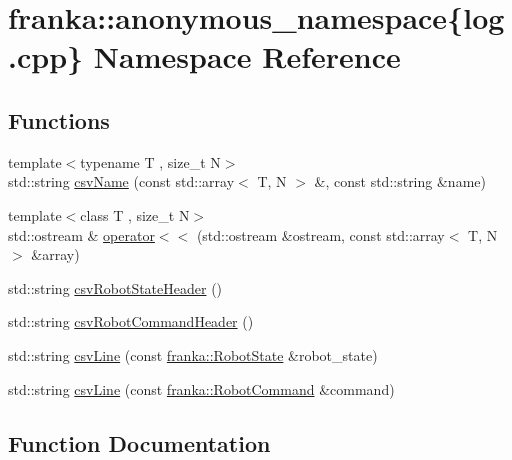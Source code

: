 \hypertarget{namespacefranka_1_1anonymous__namespace_02log_8cpp_03}{}\section{franka\+:\+:anonymous\+\_\+namespace\{log.\+cpp\} Namespace Reference}
\label{namespacefranka_1_1anonymous__namespace_02log_8cpp_03}
\subsection*{Functions}
\begin{DoxyCompactItemize}
\item 
{\footnotesize template$<$typename T , size\+\_\+t N$>$ }\\std\+::string \hyperlink{namespacefranka_1_1anonymous__namespace_02log_8cpp_03_afa84e09d4799d45ad094a8e4c2ad4c72}{csv\+Name} (const std\+::array$<$ T, N $>$ \&, const std\+::string \&name)
\item 
{\footnotesize template$<$class T , size\+\_\+t N$>$ }\\std\+::ostream \& \hyperlink{namespacefranka_1_1anonymous__namespace_02log_8cpp_03_a178381c1399ef1dfce8a148f3c336b43}{operator$<$$<$} (std\+::ostream \&ostream, const std\+::array$<$ T, N $>$ \&array)
\item 
std\+::string \hyperlink{namespacefranka_1_1anonymous__namespace_02log_8cpp_03_a6de657d62964bab6ee389fd7be7b639f}{csv\+Robot\+State\+Header} ()
\item 
std\+::string \hyperlink{namespacefranka_1_1anonymous__namespace_02log_8cpp_03_a2d7829c373ff68580a65cc5a48a2fd32}{csv\+Robot\+Command\+Header} ()
\item 
std\+::string \hyperlink{namespacefranka_1_1anonymous__namespace_02log_8cpp_03_aa34d84f9fe38a21dfbe071c07a21dd6e}{csv\+Line} (const \hyperlink{structfranka_1_1RobotState}{franka\+::\+Robot\+State} \&robot\+\_\+state)
\item 
std\+::string \hyperlink{namespacefranka_1_1anonymous__namespace_02log_8cpp_03_afc6faaf6d9388a97c26970a3f0fbf976}{csv\+Line} (const \hyperlink{structfranka_1_1RobotCommand}{franka\+::\+Robot\+Command} \&command)
\end{DoxyCompactItemize}


\subsection{Function Documentation}
\mbox{\label{namespacefranka_1_1anonymous__namespace_02log_8cpp_03_aa34d84f9fe38a21dfbe071c07a21dd6e}} 
